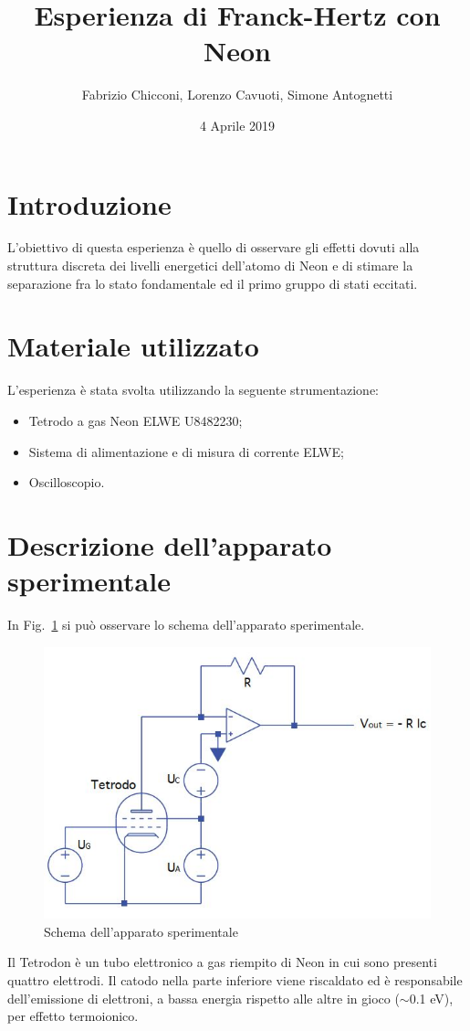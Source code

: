 \documentclass[10pt,a4paper]{article}
\title{Esperienza di Franck-Hertz con Neon}
\author{Fabrizio Chicconi, Lorenzo Cavuoti, Simone Antognetti}
\date{4 Aprile 2019}
\begin{document}
\maketitle


\section*{Introduzione}
L'obiettivo di questa esperienza è quello di osservare gli effetti dovuti alla struttura discreta dei livelli energetici dell'atomo di Neon e di stimare la separazione fra lo stato fondamentale ed il primo gruppo di stati eccitati.

\section{Materiale utilizzato}
L'esperienza è stata svolta utilizzando la seguente strumentazione:
\begin{itemize}
\item Tetrodo a gas Neon ELWE U8482230;
\item Sistema di alimentazione e di misura di corrente ELWE;
\item Oscilloscopio.
\end{itemize}

\section{Descrizione dell'apparato sperimentale}
In Fig.~\ref{fig:schema} si può osservare lo schema dell'apparato sperimentale.
\begin{figure}[h!]
	\centering
	\includegraphics[scale=0.7]{schema}
	\caption{Schema dell'apparato sperimentale}
	\label{fig:schema}
\end{figure}
Il Tetrodon è un tubo elettronico a gas riempito di Neon in cui sono presenti quattro elettrodi. Il catodo nella parte inferiore viene riscaldato ed è responsabile dell'emissione di elettroni, a bassa energia rispetto alle altre in gioco ($\sim$0.1 eV), per effetto termoionico.
\end{document}
